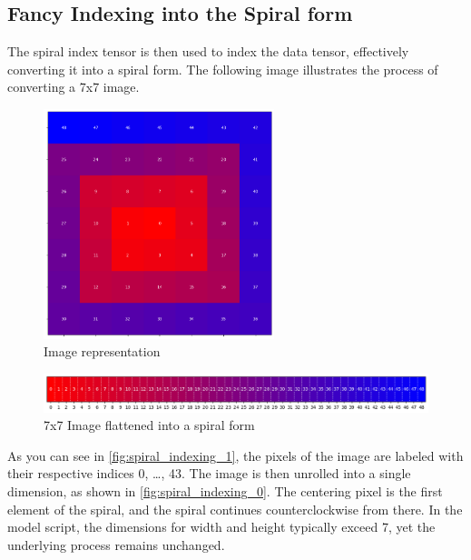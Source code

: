     \subsection{Fancy Indexing into the Spiral form}

    The spiral index tensor is then used to index the data tensor, effectively converting it into a spiral form. The following image illustrates the process of converting a 7x7 image.
    
    
    \begin{figure}[H]
    \centering
    \includegraphics[width=0.6\textwidth]{../code/dataAnalysis/plots/exampleImgs/spiralShowcase1.png}
    \caption{Image representation}
    \label{fig:spiral_indexing_1}        
    \end{figure}

    \begin{figure}[H]
    \centering
    \includegraphics[width=1\textwidth]{../code/dataAnalysis/plots/exampleImgs/spiralShowcase0.png}
    \caption{7x7 Image flattened into a spiral form} 
    \label{fig:spiral_indexing_0}        
    \end{figure}

    As you can see in \autoref{fig:spiral_indexing_1}, the pixels of the image are labeled with their respective indices 0, \dots, 43. The image is then unrolled into a single dimension, as shown in \autoref{fig:spiral_indexing_0}. The centering pixel is the first element of the spiral, and the spiral continues counterclockwise from there. In the model script, the dimensions for width and height typically exceed 7, yet the underlying process remains unchanged.

